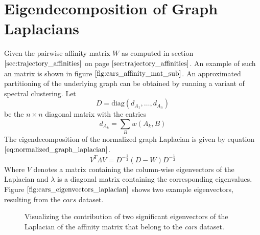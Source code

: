 \section{Eigendecomposition of Graph Laplacians}
Given the pairwise affinity matrix $W$ as computed in section $\ref{sec:trajectory_affinities}$ on page $\pageref{sec:trajectory_affinities}$. An example of such an matrix is shown in figure $\ref{fig:cars_affinity_mat_sub}$. An approximated partitioning of the underlying graph can be obtained by running a variant of spectral clustering. Let
\begin{equation}
	D = \text{diag} \left( d_{A_1}, \dots, d_{A_n} \right)
\label{eq:def_d_mat}
\end{equation}
be the $n \times n$ diagonal matrix with the entries
\begin{equation}
	d_{A_k} = \sum_B w \left( A_k, B \right)
\end{equation}
The eigendecomposition of the normalized graph Laplacian is given by equation $\ref{eq:normalized_graph_laplacian}$.
\begin{equation}
	V^{T} \Lambda V = D^{-\frac{1}{2}} \left( D - W \right) D^{-\frac{1}{2}}
	\label{eq:normalized_graph_laplacian}
\end{equation}
Where $V$ denotes a matrix containing the column-wise eigenvectors of the Laplacian and $\lambda$ is a diagonal matrix containing the corresponding eigenvalues. Figure $\ref{fig:cars_eigenvectors_laplacian}$ shows two example eigenvectors, resulting from the $\textit{cars}$ dataset.

\begin{figure}[H]
\begin{center}
\end{center}
\caption[Eigenvectors of the Laplacian]{Visualizing the contribution of two significant eigenvectors of the Laplacian of the affinity matrix that belong to the \textit{cars} dataset.}
\label{fig:cars_eigenvectors_laplacian}
\end{figure}

